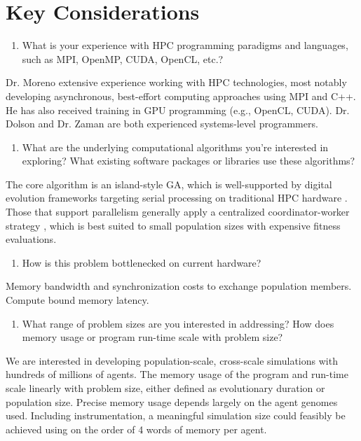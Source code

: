 \section{Key Considerations} \label{sec:key-considerations}

\begin{enumerate} \itshape \bfseries
\item %
What is your experience with HPC programming paradigms and languages, such as MPI, OpenMP, CUDA, OpenCL, etc.?
\end{enumerate}
\noindent
Dr. Moreno extensive experience working with HPC technologies, most notably developing asynchronous, best-effort computing approaches using MPI and C++.
He has also received training in GPU programming (e.g., OpenCL, CUDA).
Dr. Dolson and Dr. Zaman are both experienced systems-level programmers.

\begin{enumerate}[resume] \itshape \bfseries
\item What are the underlying computational algorithms you're interested in exploring?
What existing software packages or libraries use these algorithms?
\end{enumerate}
\noindent
The core algorithm is an island-style GA, which is well-supported by digital evolution frameworks targeting serial processing on traditional HPC hardware \citep{bohm2017mabe}.
Those that support parallelism generally apply a centralized coordinator-worker strategy \citep{fortin2012deap}, which is best suited to small population sizes with expensive fitness evaluations.

\begin{enumerate}[resume] \itshape \bfseries
\item How is this problem bottlenecked on current hardware?
\end{enumerate}
\noindent
Memory bandwidth and synchronization costs to exchange population members.
Compute bound memory latency.

\begin{enumerate}[resume] \itshape \bfseries
\item What range of problem sizes are you interested in addressing?
How does memory usage or program run-time scale with problem size?
\end{enumerate}
\noindent
We are interested in developing population-scale, cross-scale simulations with hundreds of millions of agents.
The memory usage of the program and run-time scale linearly with problem size, either defined as evolutionary duration or population size.
Precise memory usage depends largely on the agent genomes used.
Including instrumentation, a meaningful simulation size could feasibly be achieved using on the order of 4 words of memory per agent.


